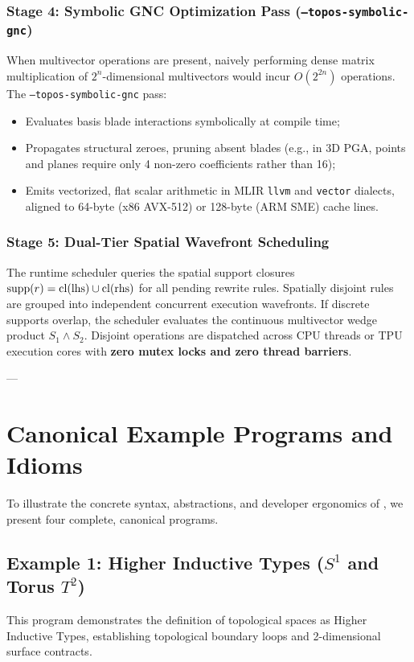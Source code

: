 \subsubsection{Stage 4: Symbolic GNC Optimization Pass (\texttt{--topos-symbolic-gnc})}
When multivector operations are present, naively performing dense matrix multiplication of $2^n$-dimensional multivectors would incur $O(2^{2n})$ operations. The \texttt{--topos-symbolic-gnc} pass:
\begin{itemize}
    \item Evaluates basis blade interactions symbolically at compile time;
    \item Propagates structural zeroes, pruning absent blades (e.g., in 3D PGA, points and planes require only 4 non-zero coefficients rather than 16);
    \item Emits vectorized, flat scalar arithmetic in MLIR \texttt{llvm} and \texttt{vector} dialects, aligned to 64-byte (x86 AVX-512) or 128-byte (ARM SME) cache lines.
\end{itemize}

\subsubsection{Stage 5: Dual-Tier Spatial Wavefront Scheduling}
The runtime scheduler queries the spatial support closures $\operatorname{supp}(r) = \operatorname{cl}(\text{lhs}) \cup \operatorname{cl}(\text{rhs})$ for all pending rewrite rules. Spatially disjoint rules are grouped into independent concurrent execution wavefronts. If discrete supports overlap, the scheduler evaluates the continuous multivector wedge product $S_1 \wedge S_2$. Disjoint operations are dispatched across CPU threads or TPU execution cores with \textbf{zero mutex locks and zero thread barriers}.

---

\section{Canonical Example Programs and Idioms}
\label{sec:canonical_programs}

To illustrate the concrete syntax, abstractions, and developer ergonomics of \ToposLang{}, we present four complete, canonical programs.

\subsection{Example 1: Higher Inductive Types ($S^1$ and Torus $T^2$)}
This program demonstrates the definition of topological spaces as Higher Inductive Types, establishing topological boundary loops and 2-dimensional surface contracts.

